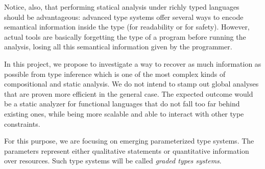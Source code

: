 \documentclass{article}[11pt]
\begin{document}
Notice, also, that performing statical analysis under richly typed languages should be advantageous:  advanced type systems offer several ways to encode semantical information inside the type (for readability or for safety). However, actual tools are basically forgetting the type of a program before running the analysis, losing all this semantical information given by the programmer.

In this project, we propose to investigate a way to recover as much information as possible from type inference which is one of the most complex kinds of compositional and static analysis.  We do not intend to stamp out global analyses that are proven more efficient in the general case. The expected outcome would be a static analyzer for functional languages that do not fall too far behind existing ones, while being more scalable and able to interact with other type constraints.


For this purpose, we are focusing on emerging parameterized type systems. The parameters represent either qualitative statements or quantitative information over resources. Such type systems will be called {\em graded types systems}.
\end{document}
